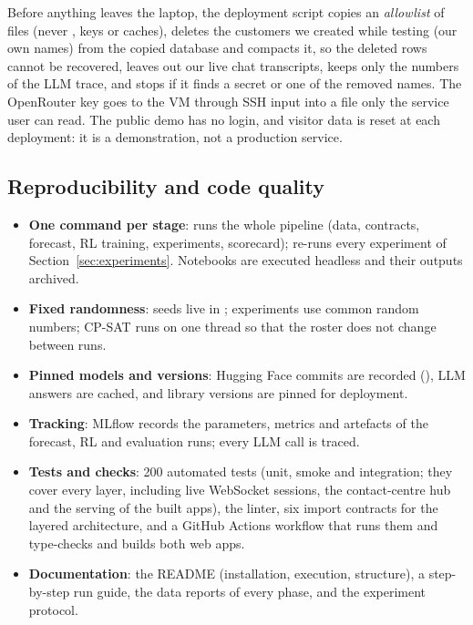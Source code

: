 Before anything leaves the laptop, the deployment script copies an \emph{allowlist} of files (never ,
keys or caches), deletes the customers we created while testing (our own names) from the copied database and
compacts it, so the deleted rows cannot be recovered, leaves out our live chat transcripts, keeps only the
numbers of the LLM trace, and stops if it finds a secret or one of the removed names. The OpenRouter key goes to
the VM through SSH input into a file only the service user can read. The public demo has no login, and visitor
data is reset at each deployment: it is a demonstration, not a production service.

\subsection{Reproducibility and code quality}
\begin{itemize}
  \item \textbf{One command per stage}:  runs the whole pipeline (data, contracts,
        forecast, RL training, experiments, scorecard);  re-runs every experiment of
        Section~\ref{sec:experiments}. Notebooks are executed headless and their outputs archived.
  \item \textbf{Fixed randomness}: seeds live in ; experiments use common random numbers; CP-SAT runs
        on one thread so that the roster does not change between runs.
  \item \textbf{Pinned models and versions}: Hugging Face commits are recorded (),
        LLM answers are cached, and library versions are pinned for deployment.
  \item \textbf{Tracking}: MLflow records the parameters, metrics and artefacts of the forecast, RL and
        evaluation runs; every LLM call is traced.
  \item \textbf{Tests and checks}: 200 automated tests (unit, smoke and integration; they cover every layer,
        including live WebSocket sessions, the contact-centre hub and the serving of the built apps), the
         linter,
        six import contracts for the layered architecture, and a GitHub Actions workflow that runs them and
        type-checks and builds both web apps.
  \item \textbf{Documentation}: the README (installation, execution, structure), a step-by-step run guide, the
        data reports of every phase, and the experiment protocol.
\end{itemize}
